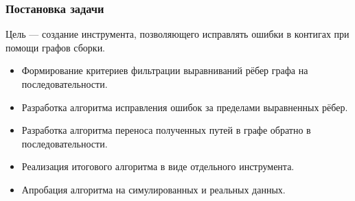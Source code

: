 \documentclass{beamer}
\begin{document}
\begin{frame}\frametitle{Постановка задачи}
Цель --- создание инструмента, позволяющего исправлять ошибки в контигах при помощи графов сборки. 
\begin{itemize}
    \item Формирование критериев фильтрации выравниваний рёбер графа на последовательности.
    \item Разработка алгоритма исправления ошибок за пределами выравненных рёбер.
    \item Разработка алгоритма переноса полученных путей в графе обратно в последовательности.
    \item Реализация итогового алгоритма в виде отдельного инструмента.
    \item Апробация алгоритма на симулированных и реальных данных.
\end{itemize}

\end{frame}

\end{document}

